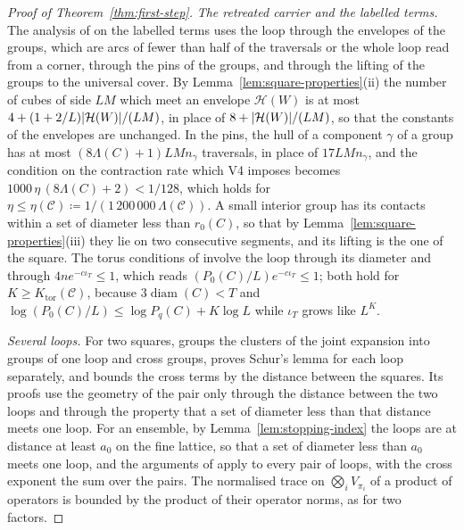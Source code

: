 \documentclass[11pt]{preprint}
\newcommand{\diam}{\operatorname{diam}}
\DeclarePairedDelimiter{\abs}{\lvert}{\rvert}
\numberwithin{equation}{section}
\theoremstyle{definition}
\theoremstyle{remark}
\theoremstyle{plain}
\begin{document}
\begin{proof}[Proof of Theorem~\ref{thm:first-step}]
\emph{The retreated carrier and the labelled terms.} The analysis of \cite[Section~9]{WilsonFirstStep} on the labelled terms uses the loop through the envelopes of the groups, which are arcs of fewer than half of the traversals or the whole loop read from a corner, through the pins of the groups, and through the lifting of the groups to the universal cover. By Lemma~\ref{lem:square-properties}(ii) the number of cubes of side $LM$ which meet an envelope $\mathcal H(W)$ is at most $4 + (1 + 2/L)\abs{\mathcal H(W)}/(LM)$, in place of $8 + \abs{\mathcal H(W)}/(LM)$, so that the constants of the envelopes are unchanged. In the pins, the hull of a component $\gamma$ of a group has at most $(8\Lambda(C) + 1)LMn_\gamma$ traversals, in place of $17LMn_\gamma$, and the condition on the contraction rate which V4 imposes becomes $1000\,\eta\,(8\Lambda(C) + 2) < 1/128$, which holds for $\eta \leq \eta(\mathcal C) \coloneqq 1/(1\,200\,000\,\Lambda(\mathcal C))$. A small interior group has its contacts within a set of diameter less than $r_0(C)$, so that by Lemma~\ref{lem:square-properties}(iii) they lie on two consecutive segments, and its lifting is the one of the square. The torus conditions of \cite{WilsonFirstStep} involve the loop through its diameter and through $4ne^{-c\iota_T} \leq 1$, which reads $(P_0(C)/L)e^{-c\iota_T} \leq 1$; both hold for $K \geq K_{\mathrm{tor}}(\mathcal C)$, because $3\diam(C) < T$ and $\log(P_0(C)/L) \leq \log P_q(C) + K\log L$ while $\iota_T$ grows like $L^K$.

\emph{Several loops.} For two squares, \cite[Section~10]{WilsonFirstStep} groups the clusters of the joint expansion into groups of one loop and cross groups, proves Schur's lemma for each loop separately, and bounds the cross terms by the distance between the squares. Its proofs use the geometry of the pair only through the distance between the two loops and through the property that a set of diameter less than that distance meets one loop. For an ensemble, by Lemma~\ref{lem:stopping-index} the loops are at distance at least $a_0$ on the fine lattice, so that a set of diameter less than $a_0$ meets one loop, and the arguments of \cite[Section~10]{WilsonFirstStep} apply to every pair of loops, with the cross exponent the sum over the pairs. The normalised trace on $\bigotimes_iV_{\pi_i}$ of a product of operators is bounded by the product of their operator norms, as for two factors.


\end{proof}
\end{document}
